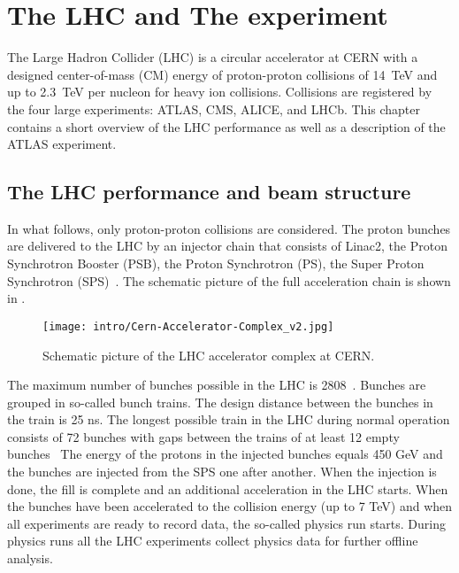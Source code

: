 

\chapter{The LHC and The \ATLAS experiment}
\label{chap:MoreStuff}

The Large Hadron Collider (LHC) is a circular accelerator at CERN with a designed center-of-mass (CM) energy of proton-proton collisions of 14~TeV and up to 2.3~TeV per nucleon for heavy ion collisions.
Collisions are registered by the four large experiments: ATLAS, CMS, ALICE, and LHCb. This chapter contains a short overview of the LHC performance as well as a description of the ATLAS experiment.

\section{The LHC performance and beam structure}

In what follows, only proton-proton collisions are considered.
The proton bunches are delivered to the LHC
by an injector chain that consists of Linac2, the Proton Synchrotron Booster (PSB), the Proton Synchrotron (PS), the Super Proton Synchrotron (SPS)~\cite{lhc_tdr_vol3}.
The schematic picture of the full acceleration chain is shown in .

\begin{figure}[]
  \centering
\texttt{[image: intro/Cern-Accelerator-Complex\_v2.jpg]}
\caption{Schematic picture of the LHC accelerator complex at CERN.}
\label{fig:accelerator_complex}
\end{figure}

The maximum number of bunches possible in the LHC is 2808~\cite{lhc_tdr_vol1}.
Bunches are grouped in so-called bunch trains.
The design distance between the bunches in the train is 25 ns.
The longest possible train in the LHC during normal operation consists of 72 bunches with gaps between the trains of at least 12 empty bunches~\cite{lhc_tdr_vol3} 
The energy of the protons in the injected bunches equals 450 GeV and the bunches are injected from the SPS one after another. 
When the injection is done, the fill is complete and an additional acceleration in the LHC starts.
When the bunches have been accelerated to the collision energy (up to 7 TeV) and when all experiments are ready to record data, the so-called physics run starts. During physics runs all the LHC experiments collect physics data for further offline analysis. 

